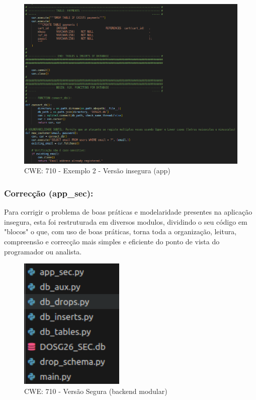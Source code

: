 \begin{figure}[H]
  \centering
  \includegraphics[width=16cm]{images/CWE-710-EX2.png}
  \caption{CWE: 710 - Exemplo 2 - Versão insegura (app)}
  \label{fig:fig:cwe710-ex2}
\end{figure}

\subsubsection{Correcção (app\_sec):}
Para corrigir o problema de boas práticas e modelaridade presentes na aplicação insegura, esta foi restruturada em diversos modulos, dividindo o seu código em "blocos" o que, com uso de boas práticas, torna toda a organização, leitura, compreensão e correcção mais simples e eficiente do ponto de vista do programador ou analista.

\begin{figure}[H]
  \centering
  \includegraphics[width=5cm]{images/CWE-710-Modular.png}
  \caption{CWE: 710 - Versão Segura (backend modular)}
  \label{fig:fig:cwe710-ex2}
\end{figure}
%
%
